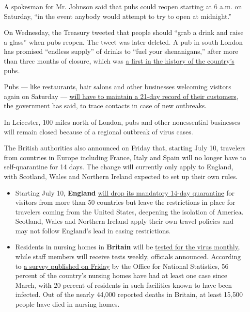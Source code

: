 A spokesman for Mr. Johnson said that pubs could reopen starting at 6
a.m. on Saturday, ``in the event anybody would attempt to try to open at
midnight.''

On Wednesday, the Treasury tweeted that people should ``grab a drink and
raise a glass'' when pubs reopen. The tweet was later deleted. A pub in
south London has promised ``endless supply'' of drinks to ``fuel your
shenanigans,'' after more than three months of closure, which was
\href{https://www.nytimes3xbfgragh.onion/2020/04/09/world/europe/uk-pub-coronavirus.html}{a
first in the history of the country's pubs}.

Pubs --- like restaurants, hair salons and other businesses welcoming
visitors again on Saturday ---
\href{https://www.gov.uk/guidance/maintaining-records-of-staff-customers-and-visitors-to-support-nhs-test-and-trace}{will
have to maintain a 21-day record of their customers}, the government has
said, to trace contacts in case of new outbreaks.

In Leicester, 100 miles north of London, pubs and other nonessential
businesses will remain closed because of a regional outbreak of virus
cases.

The British authorities also announced on Friday that, starting July 10,
travelers from countries in Europe including France, Italy and Spain
will no longer have to self-quarantine for 14 days. The change will
currently only apply to England, with Scotland, Wales and Northern
Ireland expected to set up their own rules.

\begin{itemize}
\item
  Starting July 10, \textbf{England}
  \href{https://www.nytimes3xbfgragh.onion/2020/07/03/world/europe/britain-quarantine-us-coronavirus.html}{will
  drop its mandatory 14-day quarantine} for visitors from more than 50
  countries but leave the restrictions in place for travelers coming
  from the United States, deepening the isolation of America. Scotland,
  Wales and Northern Ireland apply their own travel policies and may not
  follow England's lead in easing restrictions.
\item
  Residents in nursing homes in \textbf{Britain} will be
  \href{https://www.gov.uk/government/news/regular-retesting-rolled-out-for-care-home-staff-and-residents}{tested
  for the virus monthly}, while staff members will receive tests weekly,
  officials announced. According to
  \href{https://www.ons.gov.uk/peoplepopulationandcommunity/healthandsocialcare/conditionsanddiseases/articles/impactofcoronavirusincarehomesinenglandvivaldi/26mayto19june2020}{a
  survey published on Friday} by the Office for National Statistics, 56
  percent of the country's nursing homes have had at least one case
  since March, with 20 percent of residents in such facilities known to
  have been infected. Out of the nearly 44,000 reported deaths in
  Britain, at least 15,500 people have died in nursing homes.
\end{itemize}

